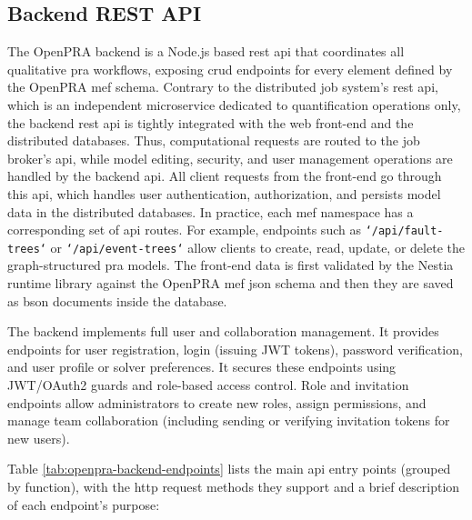 \subsection{Backend REST API}

The OpenPRA backend is a Node.js based \acrshort{rest} \acrshort{api} that coordinates all qualitative \acrshort{pra} workflows, exposing \acrfull{crud} endpoints for every element defined by the OpenPRA \acrfull{mef} schema. Contrary to the distributed job system's \acrshort{rest} \acrshort{api}, which is an independent microservice dedicated to quantification operations only, the backend \acrshort{rest} \acrshort{api} is tightly integrated with the web front-end and the distributed databases. Thus, computational requests are routed to the job broker's \acrshort{api}, while model editing, security, and user management operations are handled by the backend \acrshort{api}. All client requests from the front-end go through this \acrshort{api}, which handles user authentication, authorization, and persists model data in the distributed databases. In practice, each \acrshort{mef} namespace has a corresponding set of \acrshort{api} routes. For example, endpoints such as \texttt{`/api/fault-trees`} or \texttt{`/api/event-trees`} allow clients to create, read, update, or delete the graph-structured \acrshort{pra} models.  The front-end data is first validated by the Nestia runtime library against the OpenPRA \acrshort{mef} \acrshort{json} schema and then they are saved as \acrfull{bson} documents inside the database.

The backend implements full user and collaboration management.  It provides endpoints for user registration, login (issuing JWT tokens), password verification, and user profile or solver preferences.  It secures these endpoints using JWT/OAuth2 guards and role-based access control. Role and invitation endpoints allow administrators to create new roles, assign permissions, and manage team collaboration (including sending or verifying invitation tokens for new users).  

Table \ref{tab:openpra-backend-endpoints} lists the main \acrshort{api} entry points (grouped by function), with the \acrshort{http} request methods they support and a brief description of each endpoint's purpose:


